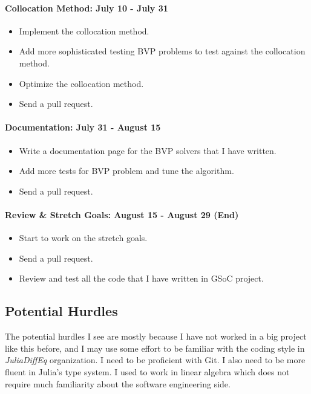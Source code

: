 \documentclass[a4paper,12pt,onecolumn]{article}
\begin{document}
\paragraph{Collocation Method: July 10 - July 31} %
\label{par:least_squares_method_july_10_july_31}
\begin{itemize}
	\item Implement the collocation method.
	\item Add more sophisticated testing BVP problems to test against the collocation method.
	\item Optimize the collocation method.
	\item Send a pull request.
\end{itemize}

\paragraph{Documentation: July 31 - August 15} %
\label{par:weighted_residual_method_july_31_august_15}
\begin{itemize}
	\item Write a documentation page for the BVP solvers that I have written.
	\item Add more tests for BVP problem and tune the algorithm.
	\item Send a pull request.
\end{itemize}

\paragraph{Review \& Stretch Goals: August 15 - August 29 (End)} %
\label{par:review_&_stretch_goals_august_15_august_29}
\begin{itemize}
	\item Start to work on the stretch goals.
	\item Send a pull request.
	\item Review and test all the code that I have written in GSoC project.
\end{itemize}

\subsection{Potential Hurdles} %
\label{sub:potential_hurdles}
The potential hurdles I see are mostly because I have not worked in a big project like
this before, and I may use some effort to be familiar with the coding style in \textit{JuliaDiffEq}
organization. I need to be proficient with Git. I also need to be more fluent in Julia's
type system. I used to work in linear algebra which does not require much familiarity
about the software engineering side.
\end{document}

